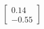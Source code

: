 \documentclass[preview]{standalone}
\begin{document}
\begin{align*}
\begin{bmatrix} 0.14 \\ -0.55 \end{bmatrix}
\end{align*}
\end{document}

